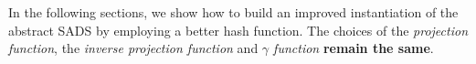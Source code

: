 In the following sections, we show how to build an improved instantiation of the abstract SADS by employing a better hash function. The choices of the {\it projection function}, the {\it inverse projection function} and {\it $\gamma$ function} {\bf remain the same}.











